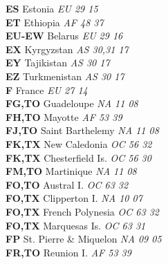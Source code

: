 ﻿\documentclass[landscape,a4paper]{article}
\begin{document}
\begin{multicols}{6}
\textbf{ES                      } Estonia                            \emph{ EU     29     15    } \\
\textbf{ET                      } Ethiopia                           \emph{ AF     48     37    } \\
\textbf{EU-EW                   } Belarus                            \emph{ EU     29     16    } \\
\textbf{EX                      } Kyrgyzstan                         \emph{ AS     30,31  17    } \\
\textbf{EY                      } Tajikistan                         \emph{ AS     30     17    } \\
\textbf{EZ                      } Turkmenistan                       \emph{ AS     30     17    } \\
\textbf{F                       } France                             \emph{ EU     27     14    } \\
\textbf{FG,TO                   } Guadeloupe                         \emph{ NA     11     08    } \\
\textbf{FH,TO                   } Mayotte                            \emph{ AF     53     39    } \\
\textbf{FJ,TO                   } Saint Barthelemy                   \emph{ NA     11     08    } \\
\textbf{FK,TX                   } New Caledonia                      \emph{ OC     56     32    } \\
\textbf{FK,TX                   } Chesterfield Is.                   \emph{ OC     56     30    } \\
\textbf{FM,TO                   } Martinique                         \emph{ NA     11     08    } \\
\textbf{FO,TO                   } Austral I.                         \emph{ OC     63     32    } \\
\textbf{FO,TX                   } Clipperton I.                      \emph{ NA     10     07    } \\
\textbf{FO,TX                   } French Polynesia                   \emph{ OC     63     32    } \\
\textbf{FO,TX                   } Marquesas Is.                      \emph{ OC     63     31    } \\
\textbf{FP                      } St. Pierre \& Miquelon             \emph{ NA     09     05    } \\
\textbf{FR,TO                   } Reunion I.                         \emph{ AF     53     39    } \\

\end{multicols}
\end{document}
